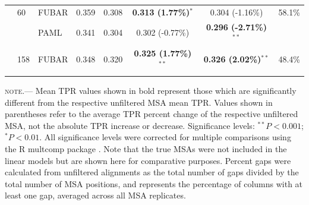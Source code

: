 \documentclass[11pt]{article}
\begin{document}
\begin{table}[htbp]
\begin{adjustwidth}{-1cm}{}
\begin{tabular}{l l l c c c c c}
 & 60 & FUBAR & 0.359 & 0.308 & \textbf{0.313 (1.77\%)$^{\ast}$} & 0.304 (-1.16\%) & 58.1\%\\
 & & PAML & 0.341 & 0.304 &0.302 (-0.77\%) & \textbf{0.296 (-2.71\%)$^{\ast\ast}$} & \\

 & 158 & FUBAR & 0.348 & 0.320 & \textbf{0.325 (1.77\%)$^{\ast\ast}$} & \textbf{0.326 (2.02\%)$^{\ast\ast}$} & 48.4\% \\
\noalign{\smallskip}\hline\noalign{\smallskip}
\end{tabular}
\newline
\textsc{note.}--- Mean TPR values shown in bold represent those which are significantly different from the respective unfiltered MSA mean TPR. Values shown in parentheses refer to the average TPR percent change of the respective unfiltered MSA, not the absolute TPR increase or decrease. Significance levels:  $^{\ast\ast} P < 0.001$; $^{\ast} P < 0.01$. All significance levels were corrected for multiple comparisons using the R multcomp package \citep{Hothorn2008}. Note that the true MSAs were not included in the linear models but are shown here for comparative purposes. Percent gaps were calculated from unfiltered alignments as the total number of gaps divided by the total number of MSA positions, and represents the percentage of columns with at least one gap, averaged across all MSA replicates.
\end{adjustwidth}
\end{table}
\end{document}

